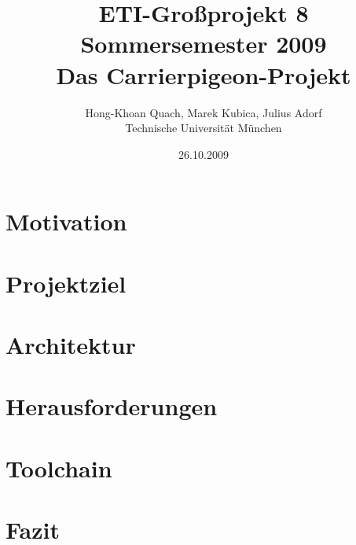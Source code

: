 \documentclass[german]{article}
\author{Hong-Khoan Quach, Marek Kubica, Julius Adorf \\ Technische Universität München}
\title{ETI-Großprojekt 8\\
       Sommersemester 2009 \\
       {\bf Das Carrierpigeon-Projekt}
}
\date{26.10.2009}
\begin{document}
\maketitle

\begin{abstract}


\end{abstract}

 

\section{Motivation}

\section{Projektziel}
\section{Architektur}
\section{Herausforderungen}
\section{Toolchain}
\section{Fazit}

\newpage

\appendix

\newpage



 
\end{document}
